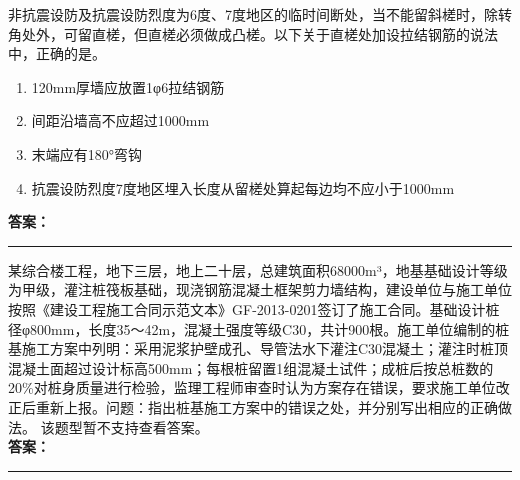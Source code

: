\documentclass[UTF8,fontset=fandol,11pt]{ctexart}
\newcommand{\answerline}{\textcolor{answerred}{\rule{2.4cm}{0.7pt}}}
\begin{document}
\begin{quizbox}[title={乱序第 13 题｜第六章砌筑工程}]

非抗震设防及抗震设防烈度为6度、7度地区的临时间断处，当不能留斜槎时，除转角处外，可留直槎，但直槎必须做成凸槎。以下关于直槎处加设拉结钢筋的说法中，正确的是。\\

\begin{enumerate}[label=\Alph*.]

\item 120mm厚墙应放置1φ6拉结钢筋

\item 间距沿墙高不应超过1000mm

\item 末端应有180°弯钩

\item 抗震设防烈度7度地区埋入长度从留槎处算起每边均不应小于1000mm

\end{enumerate}

\textbf{\textcolor{answerred}{答案：}} \answerline

\end{quizbox}

\vspace{0.2em}

\begin{quizbox}[title={乱序第 14 题｜第二章桩基础工程}]

某综合楼工程，地下三层，地上二十层，总建筑面积68000m³，地基基础设计等级为甲级，灌注桩筏板基础，现浇钢筋混凝土框架剪力墙结构，建设单位与施工单位按照《建设工程施工合同示范文本》GF-2013-0201签订了施工合同。基础设计桩径φ800mm，长度35～42m，混凝土强度等级C30，共计900根。施工单位编制的桩基施工方案中列明：采用泥浆护壁成孔、导管法水下灌注C30混凝土；灌注时桩顶混凝土面超过设计标高500mm；每根桩留置1组混凝土试件；成桩后按总桩数的20\%对桩身质量进行检验，监理工程师审查时认为方案存在错误，要求施工单位改正后重新上报。问题：指出桩基施工方案中的错误之处，并分别写出相应的正确做法。 该题型暂不支持查看答案。\\

\textbf{\textcolor{answerred}{答案：}} \answerline

\end{quizbox}

\vspace{0.2em}
\end{document}
